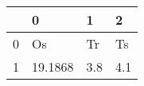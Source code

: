 \begin{tabular}{llll}
\toprule
{} &        0 &    1 &    2 \\
\midrule
0 &       Os &   Tr &   Ts \\
1 &  19.1868 &  3.8 &  4.1 \\
\bottomrule
\end{tabular}
